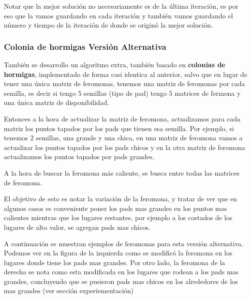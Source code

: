Notar que la mejor soluci\'on no necesariamente es de la \'ultima iteraci\'on, es por eso que la vamos guardando en cada iteraci\'on y tambi\'en vamos guardando el n\'umero y tiempo de la iteraci\'on de donde se origin\'o la mejor soluci\'on.

\subsubsection{Colonia de hormigas Versi\'on Alternativa}

Tambi\'en se desarrollo un algoritmo extra, tambi\'en basado en \textbf{colonias de hormigas}, implementado de forma casi identica al anterior, salvo que en lugar de tener una \'unica matriz de feromonas, tenemos una matriz de feromonas por cada semilla, es decir si tengo 5 semillas (tipo de pad) tengo 5 matrices de fermona y una \'unica matriz de disponibilidad. 

Entonces a la hora de actualizar la matriz de feromona, actualizamos para cada matriz los puntos tapados por los pads que tienen esa semilla. Por ejemplo, si tenemos 2 semillas, una grande y una chica, en una matriz de feromona vamos a actualizar los puntos tapados por los pads chicos y en la otra matriz de feromona actualizamos los puntos tapados por pads grandes. 

A la hora de buscar la feromona m\'as caliente, se busca entre todas las matrices de feromona.

El objetivo de esto es notar la variaci\'on de la feromona, y tratar de ver que en algunos casos es conveniente poner los pads mas grandes en los puntos mas calientes mientras que los lugares restantes, por ejemplo a los costados de los lugares de alto valor, se agregan pads mas chicos. 

\newpage

A continuaci\'on se muestran ejemplos de feromonas para esta versi\'on alternativa. Podemos ver en la figura de la izquierda como se modific\'o la feromona en los lugares donde tiene los pads mas grandes. Por otro lado, la feromona de la derecha se nota como esta modificada en los lugares que rodean a los pads mas grandes, concluyendo que se pusieron pads mas chicos en los alrededores de los mas grandes (ver secci\'on experiementaci\'on)

